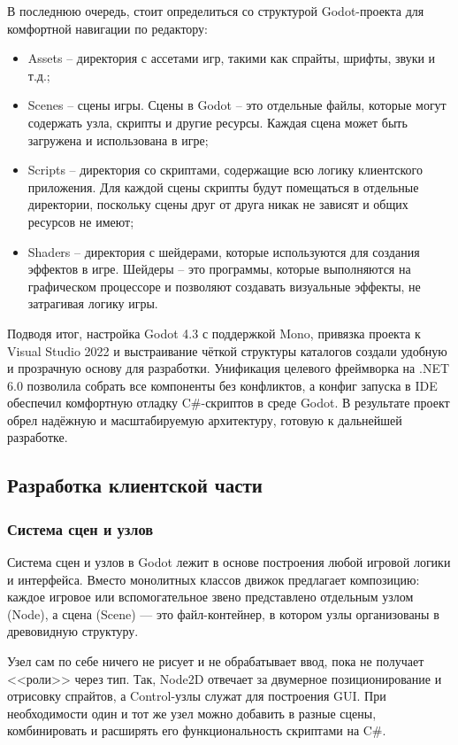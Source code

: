        В последнюю очередь, стоит определиться со структурой Godot-проекта для комфортной навигации по редактору:
        \begin{itemize}
            \item Assets -- директория с ассетами игр, такими как спрайты, шрифты, звуки и т.д.;
            \item Scenes -- сцены игры. Сцены в Godot -- это отдельные файлы, которые могут содержать узла, скрипты и другие ресурсы. Каждая сцена может быть загружена и использована в игре;
            \item Scripts -- директория со скриптами, содержащие всю логику клиентского приложения. Для каждой сцены скрипты будут помещаться в отдельные директории, поскольку сцены друг от друга никак не зависят и общих ресурсов не имеют;
            \item Shaders -- директория с шейдерами, которые используются для создания эффектов в игре. Шейдеры -- это программы, которые выполняются на графическом процессоре и позволяют создавать визуальные эффекты, не затрагивая логику игры.
        \end{itemize}

        Подводя итог, настройка Godot 4.3 с поддержкой Mono, привязка проекта к Visual Studio 2022 и выстраивание чёткой структуры каталогов создали удобную и прозрачную основу для разработки. Унификация целевого фреймворка на .NET 6.0 позволила собрать все компоненты без конфликтов, а конфиг запуска в IDE обеспечил комфортную отладку C\#-скриптов в среде Godot. В результате проект обрел надёжную и масштабируемую архитектуру, готовую к дальнейшей разработке.


    \subsection{Разработка клиентской части}

        \subsubsection{Система сцен и узлов}
        
        Система сцен и узлов в Godot лежит в основе построения любой игровой логики и интерфейса. Вместо монолитных классов движок предлагает композицию: каждое игровое или вспомогательное звено представлено отдельным узлом (Node), а сцена (Scene) — это файл-контейнер, в котором узлы организованы в древовидную структуру.

        Узел сам по себе ничего не рисует и не обрабатывает ввод, пока не получает <<роли>> через тип. Так, Node2D отвечает за двумерное позиционирование и отрисовку спрайтов, а Control-узлы служат для построения GUI. При необходимости один и тот же узел можно добавить в разные сцены, комбинировать и расширять его функциональность скриптами на C\#.

